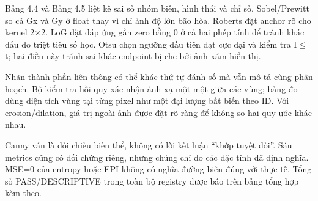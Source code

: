 \documentclass[12pt,a4paper]{extreport}
\begin{document}
Bảng 4.4 và Bảng 4.5 liệt kê sai số nhóm biên,\allowbreak{} hình thái và chỉ số. Sobel/\allowbreak{}Prewitt so cả Gx và Gy ở float thay vì chỉ ảnh độ lớn bão hòa. Roberts đặt anchor rõ cho kernel 2\ensuremath{\times}2. LoG đặt đáp ứng gần zero bằng 0 ở cả hai phép tính để tránh khác dấu do triệt tiêu số học. Otsu chọn ngưỡng đầu tiên đạt cực đại và kiểm tra I\ensuremath{\leq}t; hai điều này tránh sai khác endpoint bị che bởi ảnh xám hiển thị.
\par
Nhãn thành phần liên thông có thể khác thứ tự đánh số mà vẫn mô tả cùng phân hoạch. Bộ kiểm tra hồi quy xác nhận ánh xạ một-một giữa các vùng; bảng đo dùng diện tích vùng tại từng pixel như một đại lượng bất biến theo ID. Với erosion/\allowbreak{}dilation,\allowbreak{} giá trị ngoài ảnh được đặt rõ ràng để không so hai quy ước khác nhau.
\par
Canny vẫn là đối chiếu biến thể,\allowbreak{} không có lời kết luận “khớp tuyệt đối”. Sáu metrics cũng có đối chứng riêng,\allowbreak{} nhưng chúng chỉ đo các đặc tính đã định nghĩa. MSE=\allowbreak{}0 của entropy hoặc EPI không có nghĩa đường biên đúng với thực tế. Tổng số PASS/\allowbreak{}DESCRIPTIVE trong toàn bộ registry được báo trên bảng tổng hợp kèm theo.
\par
\end{document}
